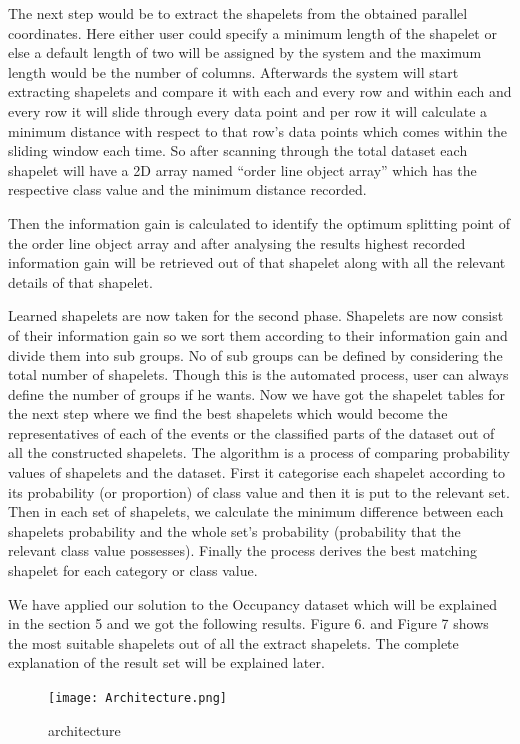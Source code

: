 \documentclass[letterpaper, 10 pt, conference]{IEEEtran}  %
\begin{document}
The next step would be to extract the shapelets from the obtained parallel coordinates. Here either user could specify a minimum length of the shapelet or else a default length of two will be assigned by the system and the maximum length would be the number of columns. Afterwards the system will start extracting shapelets and compare it with each and every row and within each and every row it will slide through every data point and per row it will calculate a minimum distance with respect to that row’s data points which comes within the sliding window each time. So after scanning through the total dataset each shapelet will have a 2D array named “order line object array” which has the respective class value and the minimum distance recorded.

Then the information gain is calculated to identify the optimum splitting point of the order line object array and after analysing the results highest recorded information gain will be retrieved out of that shapelet along with all the relevant details of that shapelet. 

Learned shapelets are now taken for the second phase. Shapelets are now consist of their information gain so we sort them according to their information gain and divide them into sub groups. No of sub groups can be defined by considering the total number of shapelets. Though this is the automated process, user can always define the number of groups if he wants. Now we have got the shapelet tables for the next step where we find the best shapelets which would become the representatives of each of the events or the classified parts of the dataset out of all the constructed shapelets. The algorithm is a process of comparing probability values of shapelets and the dataset. First it categorise each shapelet according to its probability (or proportion) of class value and then it is put to the relevant set. Then in each set of shapelets, we calculate the minimum difference between each shapelets probability and the whole set’s probability (probability that the relevant class value possesses). Finally the process derives the best matching shapelet for each category or class value.

We have applied our solution to the Occupancy dataset which will be explained in the section 5 and we got the following results. Figure 6. and Figure 7 shows the most suitable shapelets out of all the extract shapelets. The complete explanation of the result set will be explained later.

\begin{figure}[h!]
\texttt{[image: Architecture.png]}
\caption{architecture}
\end{figure}
\end{document}
